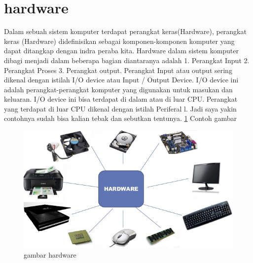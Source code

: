 
\section{hardware}
Dalam sebuah sistem komputer terdapat perangkat keras(Hardware), perangkat keras (Hardware) didefinisikan sebagai komponen-komponen komputer yang dapat ditangkap dengan indra peraba kita. Hardware dalam sistem komputer dibagi menjadi dalam beberapa bagian diantaranya adalah
1. Perangkat Input 
2. Perangkat Proses 
3. Perangkat output. 
Perangkat Input atau output sering dikenal dengan istilah I/O device atau Input / Output Device. I/O device ini adalah perangkat-perangkat komputer yang digunakan untuk masukan dan keluaran. I/O device ini bisa terdapat di dalam atau di luar CPU. Perangkat yang terdapat di luar CPU dikenal dengan istilah Periferal l. Jadi saya yakin contohnya sudah bisa kalian tebak dan sebutkan tentunya.
\ref{hardware.png}
Contoh gambar 

\begin{figure}[ht]
\centerline{\includegraphics[width=1\textwidth]{figures/hardware.png}}
\caption{gambar hardware}
\label{hardware.png}
\end{figure}

